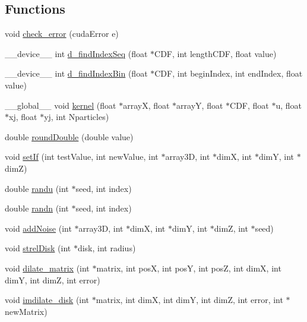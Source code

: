 \subsection*{Functions}
\begin{DoxyCompactItemize}
\item 
void \hyperlink{ex__particle__CUDA__naive_8cu_a4a894e10d3ce85515e41ac09c7f052c3}{check\_\-error} (cudaError e)
\item 
\_\-\_\-device\_\-\_\- int \hyperlink{ex__particle__CUDA__naive_8cu_ab34812b8ea6a39f94f261d2e64ae2f0f}{d\_\-findIndexSeq} (float $\ast$CDF, int lengthCDF, float value)
\item 
\_\-\_\-device\_\-\_\- int \hyperlink{ex__particle__CUDA__naive_8cu_a6ded92551e271ff186c6f08dbf3a8443}{d\_\-findIndexBin} (float $\ast$CDF, int beginIndex, int endIndex, float value)
\item 
\_\-\_\-global\_\-\_\- void \hyperlink{ex__particle__CUDA__naive_8cu_a13c2e7691b5ac6748868aa438850e0b1}{kernel} (float $\ast$arrayX, float $\ast$arrayY, float $\ast$CDF, float $\ast$u, float $\ast$xj, float $\ast$yj, int Nparticles)
\item 
double \hyperlink{ex__particle__CUDA__naive_8cu_a8b9e6dd1f65d08f3f2537574b12f7fe5}{roundDouble} (double value)
\item 
void \hyperlink{ex__particle__CUDA__naive_8cu_a0ee0664eb7123e026513e7cf19ba3434}{setIf} (int testValue, int newValue, int $\ast$array3D, int $\ast$dimX, int $\ast$dimY, int $\ast$dimZ)
\item 
double \hyperlink{ex__particle__CUDA__naive_8cu_ab1c72924f3fb8ede452cb4f287907741}{randu} (int $\ast$seed, int index)
\item 
double \hyperlink{ex__particle__CUDA__naive_8cu_a4b441b42d0a8b6dc3a2b30db3be1d6b5}{randn} (int $\ast$seed, int index)
\item 
void \hyperlink{ex__particle__CUDA__naive_8cu_ac771bf31b048f6a46077a3da36068a02}{addNoise} (int $\ast$array3D, int $\ast$dimX, int $\ast$dimY, int $\ast$dimZ, int $\ast$seed)
\item 
void \hyperlink{ex__particle__CUDA__naive_8cu_a2f03f766b1c044ea6bab007e1975a23f}{strelDisk} (int $\ast$disk, int radius)
\item 
void \hyperlink{ex__particle__CUDA__naive_8cu_af2a0216d5b584632a6508d5ad918734e}{dilate\_\-matrix} (int $\ast$matrix, int posX, int posY, int posZ, int dimX, int dimY, int dimZ, int error)
\item 
void \hyperlink{ex__particle__CUDA__naive_8cu_a707e839d9152f9bf820dee64c6627f5b}{imdilate\_\-disk} (int $\ast$matrix, int dimX, int dimY, int dimZ, int error, int $\ast$newMatrix)

\end{DoxyCompactItemize}
